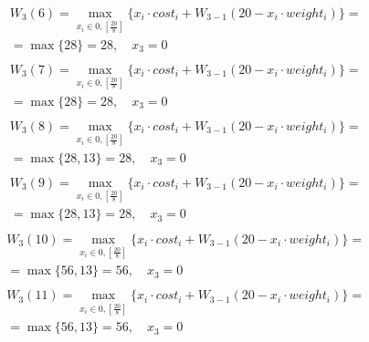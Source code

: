 \documentclass[17pt]{extarticle}
\begin{document}
\[
    \begin{aligned}
         & W_3(6)=\max_{x_i \in \overline{0, \left[\frac{20}{8}\right]}} \{x_i \cdot cost_i + W_{3-1}(20 - x_i \cdot weight_i)\}= \\& = \max \{
        28\}= 28, \quad x_3 = 0                                                                                                   \\
    \end{aligned}
\]
\[
    \begin{aligned}
         & W_3(7)=\max_{x_i \in \overline{0, \left[\frac{20}{8}\right]}} \{x_i \cdot cost_i + W_{3-1}(20 - x_i \cdot weight_i)\}= \\& = \max \{
        28\}= 28, \quad x_3 = 0                                                                                                   \\
    \end{aligned}
\]
\[
    \begin{aligned}
         & W_3(8)=\max_{x_i \in \overline{0, \left[\frac{20}{8}\right]}} \{x_i \cdot cost_i + W_{3-1}(20 - x_i \cdot weight_i)\}= \\& = \max \{
        28, 13\}= 28, \quad x_3 = 0                                                                                               \\
    \end{aligned}
\]
\[
    \begin{aligned}
         & W_3(9)=\max_{x_i \in \overline{0, \left[\frac{20}{8}\right]}} \{x_i \cdot cost_i + W_{3-1}(20 - x_i \cdot weight_i)\}= \\& = \max \{
        28, 13\}= 28, \quad x_3 = 0                                                                                               \\
    \end{aligned}
\]
\[
    \begin{aligned}
         & W_3(10)=\max_{x_i \in \overline{0, \left[\frac{20}{8}\right]}} \{x_i \cdot cost_i + W_{3-1}(20 - x_i \cdot weight_i)\}= \\& = \max \{
        56, 13\}= 56, \quad x_3 = 0                                                                                                \\
    \end{aligned}
\]
\[
    \begin{aligned}
         & W_3(11)=\max_{x_i \in \overline{0, \left[\frac{20}{8}\right]}} \{x_i \cdot cost_i + W_{3-1}(20 - x_i \cdot weight_i)\}= \\& = \max \{
        56, 13\}= 56, \quad x_3 = 0                                                                                                \\
    \end{aligned}
\]
\end{document}
